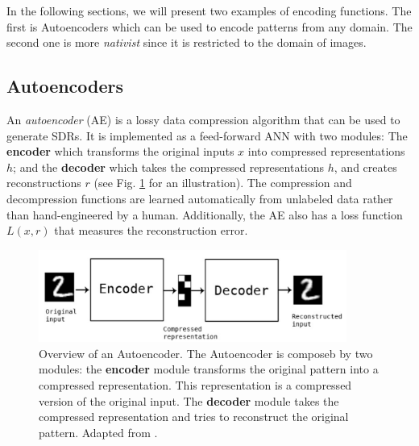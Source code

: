 \documentclass[runningheads]{llncs}
\begin{document}
In the following sections, we will present two examples of encoding functions. The first is Autoencoders which can be used to encode patterns from any domain. The second one is more \textit{nativist} since it is restricted to the domain of images.

\subsection{Autoencoders}
\label{sec:prescriptions_AEs}


An \textit{autoencoder} (AE) is a lossy data compression algorithm that can be used to generate SDRs. It is implemented as a feed-forward ANN with two modules: The \textbf{encoder} which transforms the original inputs $x$ into compressed representations $h$; and the \textbf{decoder} which takes the compressed representations $h$, and creates reconstructions $r$ (see Fig. \ref{fig:autoencoder} for an illustration). The compression and decompression functions are learned automatically from unlabeled data rather than hand-engineered by a human. Additionally, the AE also has a loss function $L(x,r)$ that measures the reconstruction error.

\begin{figure}[h]
    \centering
    \includegraphics[width=0.9\textwidth]{img/autoencoder.PNG}
    \caption{Overview of an Autoencoder. The Autoencoder is composeb by two modules: the \textbf{encoder} module transforms the original pattern into a compressed representation. This representation is a compressed version of the original input. The \textbf{decoder} module takes the compressed representation and tries to reconstruct the original pattern. Adapted from \cite{chollet2016building}.}
\label{fig:autoencoder}
\end{figure}
\end{document}
